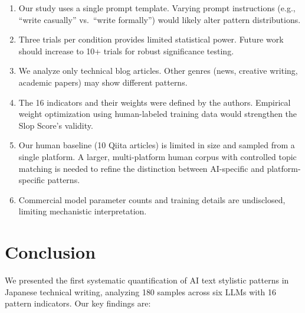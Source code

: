 \documentclass[11pt,a4paper]{article}
\begin{document}
\begin{enumerate}
    \item Our study uses a single prompt template. Varying prompt instructions (e.g., ``write casually'' vs.\ ``write formally'') would likely alter pattern distributions.
    \item Three trials per condition provides limited statistical power. Future work should increase to 10+ trials for robust significance testing.
    \item We analyze only technical blog articles. Other genres (news, creative writing, academic papers) may show different patterns.
    \item The 16 indicators and their weights were defined by the authors. Empirical weight optimization using human-labeled training data would strengthen the Slop Score's validity.
    \item Our human baseline (10 Qiita articles) is limited in size and sampled from a single platform. A larger, multi-platform human corpus with controlled topic matching is needed to refine the distinction between AI-specific and platform-specific patterns.
    \item Commercial model parameter counts and training details are undisclosed, limiting mechanistic interpretation.
\end{enumerate}

\section{Conclusion}

We presented the first systematic quantification of AI text stylistic patterns in Japanese technical writing, analyzing 180 samples across six LLMs with 16 pattern indicators. Our key findings are:
\end{document}
